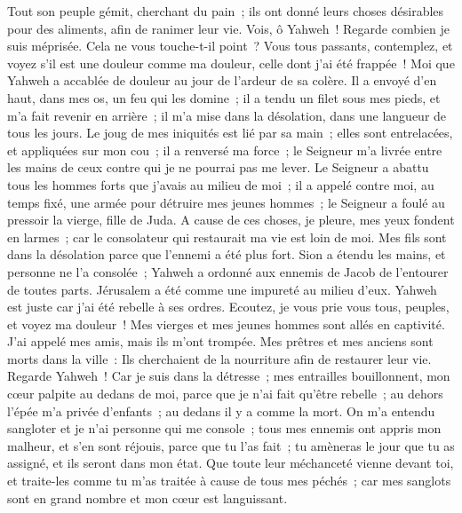 \begin{multicols}{2}
 Tout son peuple gémit, cherchant du pain~; ils ont donné leurs choses désirables pour des aliments, afin de ranimer leur vie. Vois, ô Yahweh~! Regarde combien je suis méprisée.
 Cela ne vous touche-t-il point~? Vous tous passants, contemplez, et voyez s'il est une douleur comme ma douleur, celle dont j'ai été frappée~! Moi que Yahweh a accablée de douleur au jour de l'ardeur de sa colère.
 Il a envoyé d'en haut, dans mes os, un feu qui les domine~; il a tendu un filet sous mes pieds, et m'a fait revenir en arrière~; il m'a mise dans la désolation, dans une langueur de tous les jours.
 Le joug de mes iniquités est lié par sa main~; elles sont entrelacées, et appliquées sur mon cou~; il a renversé ma force~; le Seigneur m'a livrée entre les mains de ceux contre qui je ne pourrai pas me lever.
 Le Seigneur a abattu tous les hommes forts que j'avais au milieu de moi~; il a appelé contre moi, au temps fixé, une armée pour détruire mes jeunes hommes~; le Seigneur a foulé au pressoir la vierge, fille de Juda.
 A cause de ces choses, je pleure, mes yeux fondent en larmes~; car le consolateur qui restaurait ma vie est loin de moi. Mes fils sont dans la désolation parce que l'ennemi a été plus fort.
 Sion a étendu les mains, et personne ne l'a consolée~; Yahweh a ordonné aux ennemis de Jacob de l'entourer de toutes parts. Jérusalem a été comme une impureté au milieu d'eux.
 Yahweh est juste car j'ai été rebelle à ses ordres. Ecoutez, je vous prie vous tous, peuples, et voyez ma douleur~! Mes vierges et mes jeunes hommes sont allés en captivité.
 J'ai appelé mes amis, mais ils m'ont trompée. Mes prêtres et mes anciens sont morts dans la ville~: Ils cherchaient de la nourriture afin de restaurer leur vie.
 Regarde Yahweh~! Car je suis dans la détresse~; mes entrailles bouillonnent, mon cœur palpite au dedans de moi, parce que je n'ai fait qu'être rebelle~; au dehors l'épée m'a privée d'enfants~; au dedans il y a comme la mort.
 On m'a entendu sangloter et je n'ai personne qui me console~; tous mes ennemis ont appris mon malheur, et s'en sont réjouis, parce que tu l'as fait~; tu amèneras le jour que tu as assigné, et ils seront dans mon état.
Que toute leur méchanceté vienne devant toi, et traite-les comme tu m'as traitée à cause de tous mes péchés~; car mes sanglots sont en grand nombre et mon cœur est languissant.

\end{multicols}
